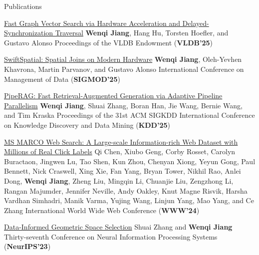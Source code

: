 \begin{rSection}{Publications}
\begin{enumerate}[label={[\arabic*]}]
\item
\begin{Pub}{\href{https://arxiv.org/abs/2406.12385}{Fast Graph Vector Search via Hardware Acceleration and Delayed-Synchronization Traversal}}
{\textbf{Wenqi Jiang}, Hang Hu, Torsten Hoefler, and Gustavo Alonso}
{Proceedings of the VLDB Endowment (\textbf{VLDB'25})}
\end{Pub}

\item
\begin{Pub}{\href{https://arxiv.org/pdf/2309.16520.pdf}{SwiftSpatial: Spatial Joins on Modern Hardware}}
{\textbf{Wenqi Jiang}, Oleh-Yevhen Khavrona, Martin Parvanov, and Gustavo Alonso}
{International Conference on Management of Data (\textbf{SIGMOD'25})}
\end{Pub}

\item
\begin{Pub}{\href{https://arxiv.org/abs/2403.05676}{PipeRAG: Fast Retrieval-Augmented Generation via Adaptive Pipeline Parallelism}}
{\textbf{Wenqi Jiang}, Shuai Zhang, Boran Han, Jie Wang, Bernie Wang, and Tim Kraska}
{Proceedings of the 31st ACM SIGKDD International Conference on Knowledge Discovery and Data Mining (\textbf{KDD'25})}
\end{Pub}

\item
\begin{Pub}{\href{https://arxiv.org/abs/2405.07526}{MS MARCO Web Search: A Large-scale Information-rich Web Dataset with Millions of Real Click Labels}}
{Qi Chen, Xiubo Geng, Corby Rosset, Carolyn Buractaon, Jingwen Lu, Tao Shen, Kun Zhou, Chenyan Xiong, Yeyun Gong, Paul Bennett, Nick Craswell, Xing Xie, Fan Yang, Bryan Tower, Nikhil Rao, Anlei Dong, \textbf{Wenqi Jiang}, Zheng Liu, Mingqin Li, Chuanjie Liu, Zengzhong Li, Rangan Majumder, Jennifer Neville, Andy Oakley, Knut Magne Risvik, Harsha Vardhan Simhadri, Manik Varma, Yujing Wang, Linjun Yang, Mao Yang, and Ce Zhang}
{International World Wide Web Conference (\textbf{WWW'24})}
\end{Pub}

\item
\begin{Pub}{\href{https://proceedings.neurips.cc/paper_files/paper/2023/file/486ff0b164cf92b0255fe39863bcf99e-Paper-Conference.pdf}{Data-Informed Geometric Space Selection}}
{Shuai Zhang and \textbf{Wenqi Jiang}}
{Thirty-seventh Conference on Neural Information Processing Systems (\textbf{NeurIPS'23})}
\end{Pub}


\end{enumerate}
\end{rSection}
